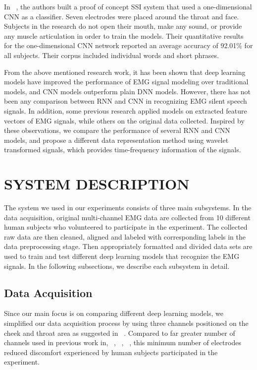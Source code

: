 \documentclass{article}
\begin{document}
In ~\cite{kapur_alterego:_2018}, the authors built a proof of concept SSI system that used a one-dimensional CNN as a classifier. Seven electrodes were placed around the throat and face.  Subjects in the research do not open their mouth, make any sound, or provide any muscle articulation in order to train the models. Their quantitative results for the one-dimensional CNN network reported an average accuracy of 92.01\% for all subjects. Their corpus included individual words and short phrases.

From the above mentioned research work, it has been shown that deep learning models have improved the performance of EMG signal modeling over traditional models, and CNN models outperform plain DNN models. However, there has not been any comparison between RNN and CNN in recognizing EMG silent speech signals. In addition, some previous research  applied models on extracted feature vectors of EMG signals, while others on the original data collected. Inspired by these observations, we compare the performance of several RNN and CNN models, and propose a different data representation method using wavelet transformed signals, which provides time-frequency information of the signals.  

\section{SYSTEM DESCRIPTION}
\label{sec:SYSTEM DESCRIPTION}

The system we used in our experiments consists of three main subsystems. In the data acquisition, original multi-channel  EMG data are collected from 10 different human subjects who volunteered to participate in the experiment. The collected raw data are then cleaned, aligned and labeled with corresponding labels in the data preprocessing stage. Then appropriately formatted and divided data sets are used to train and test different deep learning models that recognize the EMG signals. In the following subsections, we describe each subsystem in detail. 

\subsection{Data Acquisition}
\label{ssec:Capturing Data}
Since our main focus is on comparing different deep learning models, we simplified our data acquisition process by using three channels positioned on the cheek and throat area as suggested in ~\cite{maier-hein_session_2005}. Compared to far greater number of channels used in previous work in\cite{kapur_alterego:_2018}, ~\cite{wand_pattern_2014}, ~\cite{janke_emg--speech:_2017}, ~\cite{maier-hein_session_2005}, this minimum number of electrodes reduced discomfort experienced by human subjects participated in the experiment. 
\end{document}
